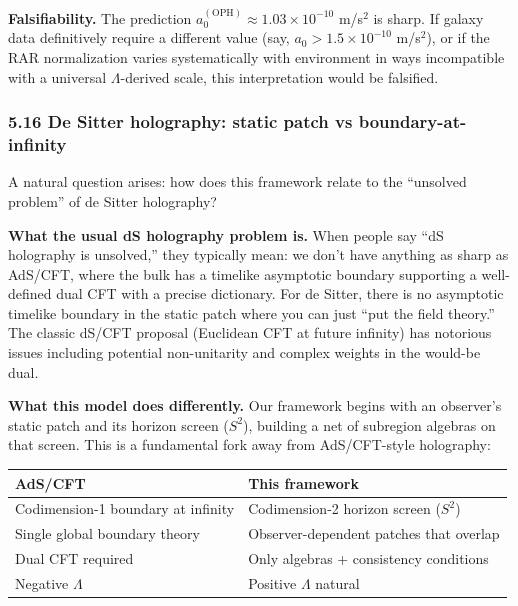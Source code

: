 \documentclass[
]{article}
\newcounter{none} %
\begin{document}
\textbf{Falsifiability.} The prediction
\(a_0^{\mathrm{(OPH)}} \approx 1.03 \times
10^{-10}\) m/s\(^2\) is sharp. If galaxy data definitively require a
different value (say, \(a_0 > 1.5 \times 10^{-10}\) m/s\(^2\)), or if
the RAR normalization varies systematically with environment in ways
incompatible with a universal \(\Lambda\)-derived scale, this
interpretation would be falsified.

\subsubsection{5.16 De Sitter holography: static patch vs
boundary-at-infinity}\label{de-sitter-holography-static-patch-vs-boundary-at-infinity}

A natural question arises: how does this framework relate to the
``unsolved problem'' of de Sitter holography?

\textbf{What the usual dS holography problem is.} When people say ``dS
holography is unsolved,'' they typically mean: we don't have anything as
sharp as AdS/CFT, where the bulk has a timelike asymptotic boundary
supporting a well-defined dual CFT with a precise dictionary. For de
Sitter, there is no asymptotic timelike boundary in the static patch
where you can just ``put the field theory.'' The classic dS/CFT proposal
(Euclidean CFT at future infinity) has notorious issues including
potential non-unitarity and complex weights in the would-be dual.

\textbf{What this model does differently.} Our framework begins with an
observer's static patch and its horizon screen (\(S^2\)), building a net
of subregion algebras on that screen. This is a fundamental fork away
from AdS/CFT-style holography:

{\def\LTcaptype{none} %
\begin{longtable}[]{@{}
  >{\raggedright\arraybackslash}p{}
  >{\raggedright\arraybackslash}p{}@{}}
\toprule\noalign{}
\begin{minipage}[b]{\linewidth}\raggedright
AdS/CFT
\end{minipage} & \begin{minipage}[b]{\linewidth}\raggedright
This framework
\end{minipage} \\
\midrule\noalign{}
\endhead
\bottomrule\noalign{}
\endlastfoot
Codimension-1 boundary at infinity & Codimension-2 horizon screen
(\(S^2\)) \\
Single global boundary theory & Observer-dependent patches that
overlap \\
Dual CFT required & Only algebras + consistency conditions \\
Negative \(\Lambda\) & Positive \(\Lambda\) natural \\
\end{longtable}
}
\end{document}
